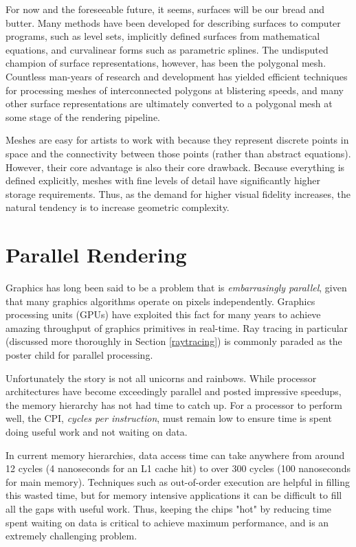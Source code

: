 \documentclass[12pt]{ucthesis}
\begin{document}
For now and the foreseeable future, it seems, surfaces will be our bread and
butter. Many methods have been developed for describing surfaces to computer
programs, such as level sets, implicitly defined surfaces from mathematical
equations, and curvalinear forms such as parametric splines. The undisputed
champion of surface representations, however, has been the polygonal mesh.
Countless man-years of research and development has yielded efficient
techniques for processing meshes of interconnected polygons at blistering
speeds, and many other surface representations are ultimately converted to a
polygonal mesh at some stage of the rendering pipeline.

Meshes are easy for artists to work with because they represent discrete
points in space and the connectivity between those points (rather than abstract
equations). However, their core advantage is also their core drawback. Because
everything is defined explicitly, meshes with fine levels of detail have
significantly higher storage requirements. Thus, as the demand for higher
visual fidelity increases, the natural tendency is to increase geometric
complexity.

\section{Parallel Rendering}
\label{parallel}

Graphics has long been said to be a problem that is \emph{embarrasingly parallel},
given that many graphics algorithms operate on pixels independently. Graphics
processing units (GPUs) have exploited this fact for many years to achieve
amazing throughput of graphics primitives in real-time. Ray tracing in
particular (discussed more thoroughly in Section \ref{raytracing}) is commonly
paraded as the poster child for parallel processing.

Unfortunately the story is not all unicorns and rainbows. While processor
architectures have become exceedingly parallel and posted impressive
speedups, the memory hierarchy has not had time to catch up. For a processor
to perform well, the CPI, \emph{cycles per instruction}, must remain low to
ensure time is spent doing useful work and not waiting on data.

In current memory hierarchies, data access time can take anywhere from around
12 cycles (4 nanoseconds for an L1 cache hit) to over 300 cycles (100
nanoseconds for main memory). Techniques such as out-of-order execution are
helpful in filling this wasted time, but for memory intensive applications it
can be difficult to fill all the gaps with useful work. Thus, keeping the chips
"hot" by reducing time spent waiting on data is critical to achieve maximum
performance, and is an extremely challenging problem.
\end{document}
